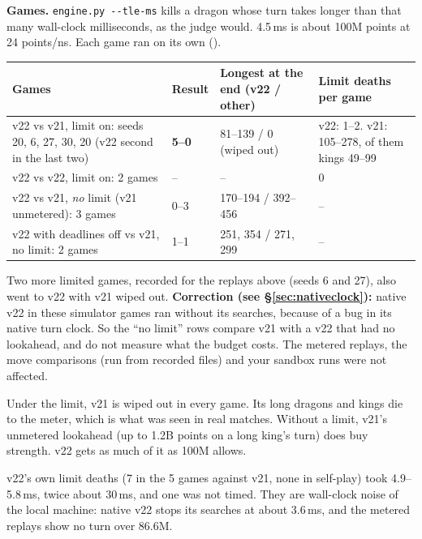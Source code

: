 \documentclass[11pt,a4paper]{article}
\newcommand{\code}[1]{\texttt{\detokenize{#1}}}
\begin{document}
\textbf{Games.} \texttt{engine.py -{}-tle-ms} kills a dragon whose turn takes longer than that many wall-clock milliseconds, as the
judge would. 4.5\,ms is about 100M points at 24 points/ns. Each game ran on its own (\code{ab_tle.sh}).
\begin{center}
\begin{tabular}{@{}>{\raggedright}p{4.6cm}>{\raggedright}p{1.3cm}>{\raggedright}p{3.6cm}p{5.4cm}@{}}
\toprule
Games & Result & Longest at the end (v22 / other) & Limit deaths per game \\
\midrule
v22 vs v21, limit on: seeds 20, 6, 27, 30, 20 (v22 second in the last two) & \textbf{5--0} & 81--139 / 0 (wiped out) &
v22: 1--2. v21: 105--278, of them kings 49--99 \\
v22 vs v22, limit on: 2 games & -- & -- & 0 \\
v22 vs v21, \emph{no} limit (v21 unmetered): 3 games & 0--3 & 170--194 / 392--456 & -- \\
v22 with deadlines off vs v21, no limit: 2 games & 1--1 & 251, 354 / 271, 299 & -- \\
\bottomrule
\end{tabular}
\end{center}
Two more limited games, recorded for the replays above (seeds 6 and 27), also went to v22 with v21 wiped out.
\textbf{Correction (see \S\ref{sec:nativeclock}):} native v22 in these simulator games ran without its searches, because
of a bug in its native turn clock. So the ``no limit'' rows compare v21 with a v22 that had no lookahead, and do not measure
what the budget costs. The metered replays, the move comparisons (run from recorded files) and your sandbox runs were not
affected.

Under the limit, v21 is wiped out in every game. Its long dragons and kings die to the meter, which is what was seen in
real matches. Without a limit, v21's unmetered lookahead (up to 1.2B points on a long king's turn) does buy strength. v22
gets as much of it as 100M allows.

v22's own limit deaths (7 in the 5 games against v21, none in self-play) took 4.9--5.8\,ms, twice about 30\,ms, and one was not
timed. They are wall-clock noise of the local machine: native v22 stops its searches at about 3.6\,ms, and the metered
replays show no turn over 86.6M.
\end{document}
